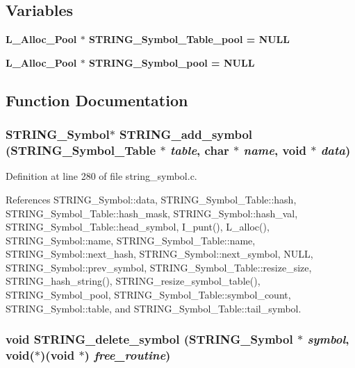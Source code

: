 \subsection*{Variables}
\begin{CompactItemize}
\item 
\bf{L\_\-Alloc\_\-Pool} $\ast$ \bf{STRING\_\-Symbol\_\-Table\_\-pool} = NULL
\item 
\bf{L\_\-Alloc\_\-Pool} $\ast$ \bf{STRING\_\-Symbol\_\-pool} = NULL
\end{CompactItemize}


\subsection{Function Documentation}
\subsubsection{\setlength{\rightskip}{0pt plus 5cm}\bf{STRING\_\-Symbol}$\ast$ STRING\_\-add\_\-symbol (\bf{STRING\_\-Symbol\_\-Table} $\ast$ {\em table}, char $\ast$ {\em name}, void $\ast$ {\em data})}\label{string__symbol_8c_3a03bfbed0ac7378507b799366f99c83}




Definition at line 280 of file string\_\-symbol.c.

References STRING\_\-Symbol::data, STRING\_\-Symbol\_\-Table::hash, STRING\_\-Symbol\_\-Table::hash\_\-mask, STRING\_\-Symbol::hash\_\-val, STRING\_\-Symbol\_\-Table::head\_\-symbol, I\_\-punt(), L\_\-alloc(), STRING\_\-Symbol::name, STRING\_\-Symbol\_\-Table::name, STRING\_\-Symbol::next\_\-hash, STRING\_\-Symbol::next\_\-symbol, NULL, STRING\_\-Symbol::prev\_\-symbol, STRING\_\-Symbol\_\-Table::resize\_\-size, STRING\_\-hash\_\-string(), STRING\_\-resize\_\-symbol\_\-table(), STRING\_\-Symbol\_\-pool, STRING\_\-Symbol\_\-Table::symbol\_\-count, STRING\_\-Symbol::table, and STRING\_\-Symbol\_\-Table::tail\_\-symbol.
\subsubsection{\setlength{\rightskip}{0pt plus 5cm}void STRING\_\-delete\_\-symbol (\bf{STRING\_\-Symbol} $\ast$ {\em symbol}, void($\ast$)(void $\ast$) {\em free\_\-routine})}\label{string__symbol_8c_9830714aecfd211f9b8885229dadaf6a}




